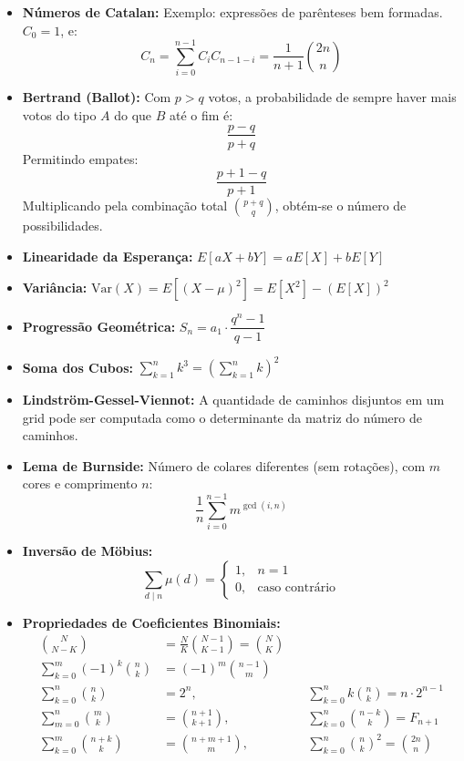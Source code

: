 \documentclass[12pt,a4paper]{article}
\begin{document}
\begin{small}
\begin{itemize}
    \item \textbf{Números de Catalan:}  
    Exemplo: expressões de parênteses bem formadas.  
    $C_0 = 1$, e:
    \[
    C_n = \sum_{i=0}^{n-1} C_i C_{n-1-i} = \frac{1}{n+1}\binom{2n}{n}
    \]

    \item \textbf{Bertrand (Ballot):}  
    Com $p > q$ votos, a probabilidade de sempre haver mais votos do tipo $A$ do que $B$ até o fim é:
    \[
    \frac{p-q}{p+q}
    \]
    Permitindo empates: 
    \[
    \frac{p+1-q}{p+1}
    \]
    Multiplicando pela combinação total $\binom{p+q}{q}$, obtém-se o número de possibilidades.

    \item \textbf{Linearidade da Esperança:}  
    $E[aX + bY] = aE[X] + bE[Y]$

    \item \textbf{Variância:}  
    $\mathrm{Var}(X) = E[(X - \mu)^2] = E[X^2] - (E[X])^2$

    \item \textbf{Progressão Geométrica:}  
    $S_n = a_1 \cdot \dfrac{q^n - 1}{q - 1}$

    \item \textbf{Soma dos Cubos:}  
    $\displaystyle \sum_{k=1}^{n} k^3 = \left(\sum_{k=1}^{n} k\right)^2$

    \item \textbf{Lindström-Gessel-Viennot:}  
    A quantidade de caminhos disjuntos em um grid pode ser computada como o determinante da matriz do número de caminhos.

    \item \textbf{Lema de Burnside:}  
    Número de colares diferentes (sem rotações), com $m$ cores e comprimento $n$:
    \[
    \frac{1}{n}\sum_{i=0}^{n-1} m^{\gcd(i,n)}
    \]

    \item \textbf{Inversão de Möbius:}
    \[
    \sum_{d \mid n} \mu(d) =
    \begin{cases}
    1, & n = 1 \\
    0, & \text{caso contrário}
    \end{cases}
    \]

    \item \textbf{Propriedades de Coeficientes Binomiais:}
    \begin{align*}
        \binom{N}{N-K} &= \frac{N}{K} \binom{N-1}{K-1} = \binom{N}{K} \\[0.5ex]
        \sum_{k=0}^{m} (-1)^k \binom{n}{k} &= (-1)^m \binom{n-1}{m} \\[0.5ex]
        \sum_{k=0}^{n} \binom{n}{k} &= 2^n, 
        & \quad \sum_{k=0}^{n} k \binom{n}{k} = n \cdot 2^{n-1} \\[0.5ex]
        \sum_{m=0}^{n} \binom{m}{k} &= \binom{n+1}{k+1}, 
        & \quad \sum_{k=0}^{n} \binom{n-k}{k} = F_{n+1} \\[0.5ex]
        \sum_{k=0}^{m} \binom{n+k}{k} &= \binom{n+m+1}{m}, 
        & \quad \sum_{k=0}^{n} \binom{n}{k}^2 = \binom{2n}{n}
    \end{align*}


\end{itemize}
\end{small}
\end{document}
